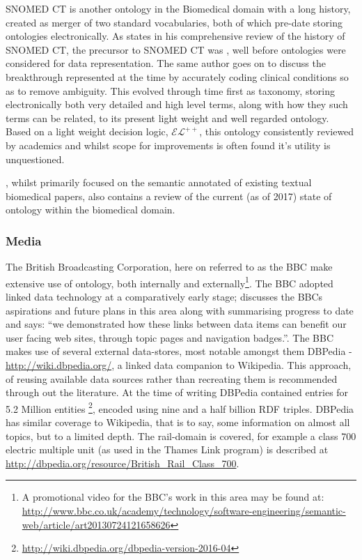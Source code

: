 SNOMED CT is another ontology in the Biomedical domain with a long history, created as merger of two standard vocabularies, both of which pre-date storing ontologies electronically. As \citet{Chute2000} states in his comprehensive review of the history of SNOMED CT, the precursor to SNOMED CT was , well before ontologies were considered for data representation. The same author goes on to discuss the breakthrough represented at the time by accurately coding clinical conditions so as to remove ambiguity. This evolved through time first as taxonomy, storing electronically both very detailed and high level terms, along with how they such terms can be related, to its present light weight and well regarded ontology.  Based on a light weight decision logic, \(\mathcal{EL}^{++}\), this ontology consistently reviewed by academics and whilst scope for improvements is often found it's utility is unquestioned. 

\citet{Jovanovic2017}, whilst primarily focused on the semantic annotated of existing textual biomedical papers, also contains a review of the current (as of 2017) state of ontology within the biomedical domain.

\subsubsection{Media}
\label{sec:media}
The British Broadcasting Corporation, here on referred to as the BBC make extensive use of ontology, both internally and externally\footnote{A promotional video  for the BBC's work in this area may be found at: \url{http://www.bbc.co.uk/academy/technology/software-engineering/semantic-web/article/art20130724121658626}}. The BBC adopted linked data technology at a comparatively early stage; \citet{Geo09} discusses the BBCs aspirations and future plans in this area along with summarising progress to date and says: ``we demonstrated how these links between data items can benefit our user facing web sites, through topic pages and navigation badges.''. The BBC makes use of several external data-stores, most notable amongst them DBPedia - \url{http://wiki.dbpedia.org/}, a linked data companion to Wikipedia. This approach, of reusing available data sources rather than recreating them is recommended through out the literature. At the time of writing DBPedia contained  entries for 5.2 Million entities \footnote{\url{http://wiki.dbpedia.org/dbpedia-version-2016-04}}, encoded using nine and a half billion RDF triples. DBPedia has similar coverage to Wikipedia, that is to say, some information on almost all topics, but to a limited depth. The rail-domain is covered, for example a class 700 electric multiple unit (as used in the Thames Link program) is described at \url{http://dbpedia.org/resource/British_Rail_Class_700}.

